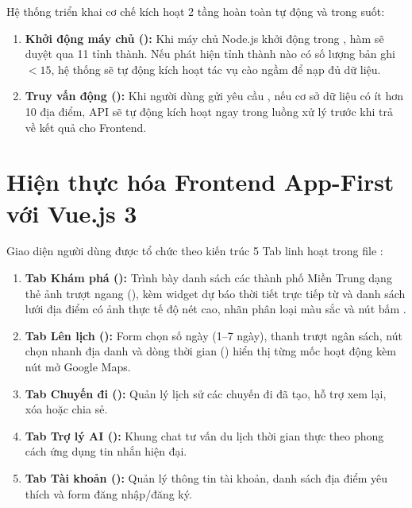 Hệ thống triển khai cơ chế kích hoạt 2 tầng hoàn toàn tự động và trong suốt:
\begin{enumerate}
    \item \textbf{Khởi động máy chủ ():} Khi máy chủ Node.js khởi động trong , hàm  sẽ duyệt qua 11 tỉnh thành. Nếu phát hiện tỉnh thành nào có số lượng bản ghi $< 15$, hệ thống sẽ tự động kích hoạt tác vụ cào ngầm để nạp đủ dữ liệu.
    \item \textbf{Truy vấn động ():} Khi người dùng gửi yêu cầu , nếu cơ sở dữ liệu có ít hơn 10 địa điểm, API sẽ tự động kích hoạt  ngay trong luồng xử lý trước khi trả về kết quả cho Frontend.
\end{enumerate}

\section{Hiện thực hóa Frontend App-First với Vue.js 3}

Giao diện người dùng được tổ chức theo kiến trúc 5 Tab linh hoạt trong file :

\begin{enumerate}
    \item \textbf{Tab Khám phá ():} Trình bày danh sách các thành phố Miền Trung dạng thẻ ảnh trượt ngang (), kèm widget dự báo thời tiết trực tiếp từ  và danh sách lưới địa điểm có ảnh thực tế độ nét cao, nhãn phân loại màu sắc và nút bấm .
    \item \textbf{Tab Lên lịch ():} Form chọn số ngày (1--7 ngày), thanh trượt ngân sách, nút chọn nhanh địa danh và dòng thời gian () hiển thị từng mốc hoạt động kèm nút  mở Google Maps.
    \item \textbf{Tab Chuyến đi ():} Quản lý lịch sử các chuyến đi đã tạo, hỗ trợ xem lại, xóa hoặc chia sẻ.
    \item \textbf{Tab Trợ lý AI ():} Khung chat tư vấn du lịch thời gian thực theo phong cách ứng dụng tin nhắn hiện đại.
    \item \textbf{Tab Tài khoản ():} Quản lý thông tin tài khoản, danh sách địa điểm yêu thích và form đăng nhập/đăng ký.
\end{enumerate}

